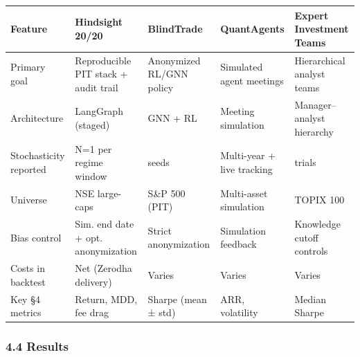 \documentclass[
]{article}
\newcounter{none} %
\begin{document}
{\def\LTcaptype{none} %
\begin{longtable}[]{@{}
  >{\raggedright\arraybackslash}p{}
  >{\raggedright\arraybackslash}p{}
  >{\raggedright\arraybackslash}p{}
  >{\raggedright\arraybackslash}p{}
  >{\raggedright\arraybackslash}p{}@{}}
\toprule\noalign{}
\begin{minipage}[b]{\linewidth}\raggedright
Feature
\end{minipage} & \begin{minipage}[b]{\linewidth}\raggedright
Hindsight 20/20
\end{minipage} & \begin{minipage}[b]{\linewidth}\raggedright
BlindTrade
\end{minipage} & \begin{minipage}[b]{\linewidth}\raggedright
QuantAgents
\end{minipage} & \begin{minipage}[b]{\linewidth}\raggedright
Expert Investment Teams
\end{minipage} \\
\midrule\noalign{}
\endhead
\bottomrule\noalign{}
\endlastfoot
Primary goal & Reproducible PIT stack + audit trail & Anonymized RL/GNN
policy & Simulated agent meetings & Hierarchical analyst teams \\
Architecture & LangGraph (staged) & GNN + RL & Meeting simulation &
Manager--analyst hierarchy \\
Stochasticity reported & N=1 per regime window & 20 seeds & Multi-year +
live tracking & 50 trials \\
Universe & 2 NSE large-caps & S\&P 500 (PIT) & Multi-asset simulation &
TOPIX 100 \\
Bias control & Sim. end date + opt. anonymization & Strict anonymization
& Simulation feedback & Knowledge cutoff controls \\
Costs in backtest & Net (Zerodha delivery) & Varies & Varies & Varies \\
Key §4 metrics & Return, MDD, fee drag & Sharpe (mean ± std) & ARR,
volatility & Median Sharpe \\
\end{longtable}
}

\subsubsection{4.4 Results}\label{results}
\end{document}
